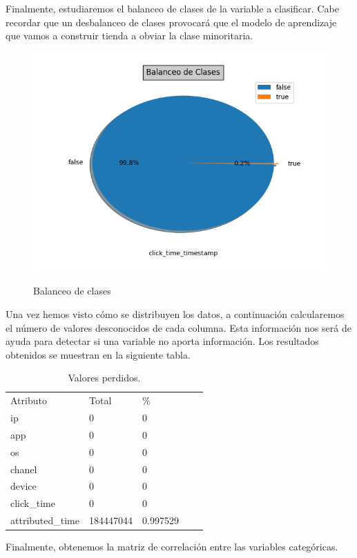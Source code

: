 Finalmente, estudiaremos el balanceo de clases de la variable a clasificar. Cabe recordar que un desbalanceo de clases provocará que el modelo de aprendizaje que vamos a construir tienda a obviar la clase minoritaria.
\begin{figure}[H]
\includegraphics[scale=0.75]{img/imbalacing.png}
\label{}
\caption{Balanceo de clases}
\end{figure}
Una vez hemos visto cómo se distribuyen los datos, a continuación calcularemos el número de valores desconocidos de cada columna. Esta información nos será de ayuda para detectar si una variable no aporta información. Los resultados obtenidos se muestran en la siguiente tabla.
\begin{table}[H]
	\centering
	\begin{tabular}{lllll}
	Atributo& Total & \%    \\
	ip	& 0 &0 \\
	app	& 0 & 0   \\
	os	& 0 & 0 \\
	chanel &0 & 0 \\
	device & 0 & 0  \\
	click\_time& 0& 0 \\
	attributed\_time &184447044& 0.997529
	\end{tabular}
	\caption{Valores perdidos.}
\label{}
\end{table}

Finalmente, obtenemos la matriz de correlación entre las variables categóricas.
 
